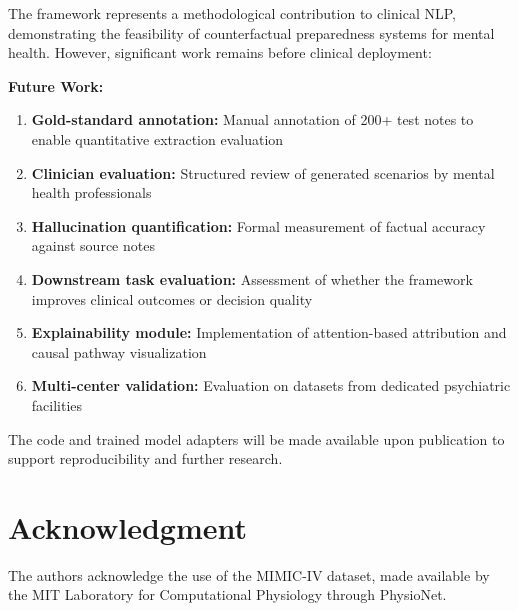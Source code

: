\documentclass[conference]{IEEEtran}
\begin{document}
The framework represents a methodological contribution to clinical NLP, demonstrating the feasibility of counterfactual preparedness systems for mental health. However, significant work remains before clinical deployment:

\textbf{Future Work:}
\begin{enumerate}
\item \textbf{Gold-standard annotation:} Manual annotation of 200+ test notes to enable quantitative extraction evaluation
\item \textbf{Clinician evaluation:} Structured review of generated scenarios by mental health professionals
\item \textbf{Hallucination quantification:} Formal measurement of factual accuracy against source notes
\item \textbf{Downstream task evaluation:} Assessment of whether the framework improves clinical outcomes or decision quality
\item \textbf{Explainability module:} Implementation of attention-based attribution and causal pathway visualization
\item \textbf{Multi-center validation:} Evaluation on datasets from dedicated psychiatric facilities
\end{enumerate}

The code and trained model adapters will be made available upon publication to support reproducibility and further research.

\section*{Acknowledgment}

The authors acknowledge the use of the MIMIC-IV dataset, made available by the MIT Laboratory for Computational Physiology through PhysioNet.
\end{document}
